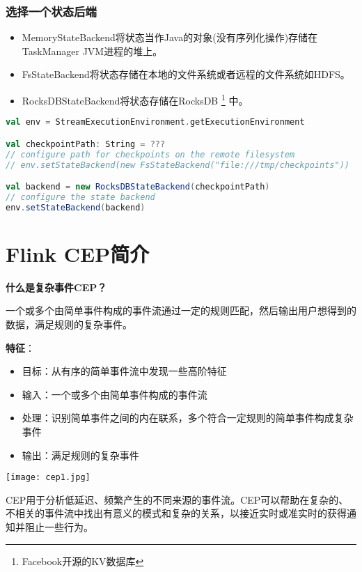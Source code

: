 \documentclass[oneside]{ctexbook}
\begin{document}
\subsection{选择一个状态后端}

\begin{itemize}
\item MemoryStateBackend将状态当作Java的对象(没有序列化操作)存储在TaskManager JVM进程的堆上。
\item FsStateBackend将状态存储在本地的文件系统或者远程的文件系统如HDFS。
\item RocksDBStateBackend将状态存储在RocksDB \footnote{Facebook开源的KV数据库} 中。
\end{itemize}

\begin{lstlisting}[language=scala]
val env = StreamExecutionEnvironment.getExecutionEnvironment

val checkpointPath: String = ???
// configure path for checkpoints on the remote filesystem
// env.setStateBackend(new FsStateBackend("file:///tmp/checkpoints"))

val backend = new RocksDBStateBackend(checkpointPath)
// configure the state backend
env.setStateBackend(backend)
\end{lstlisting}



\chapter{Flink CEP简介}

\textbf{什么是复杂事件CEP？}

一个或多个由简单事件构成的事件流通过一定的规则匹配，然后输出用户想得到的数据，满足规则的复杂事件。

\textbf{特征}：

\begin{itemize}
\item 目标：从有序的简单事件流中发现一些高阶特征
\item 输入：一个或多个由简单事件构成的事件流
\item 处理：识别简单事件之间的内在联系，多个符合一定规则的简单事件构成复杂事件
\item 输出：满足规则的复杂事件
\end{itemize}

\noindent \texttt{[image: cep1.jpg]}

CEP用于分析低延迟、频繁产生的不同来源的事件流。CEP可以帮助在复杂的、不相关的事件流中找出有意义的模式和复杂的关系，以接近实时或准实时的获得通知并阻止一些行为。
\end{document}
